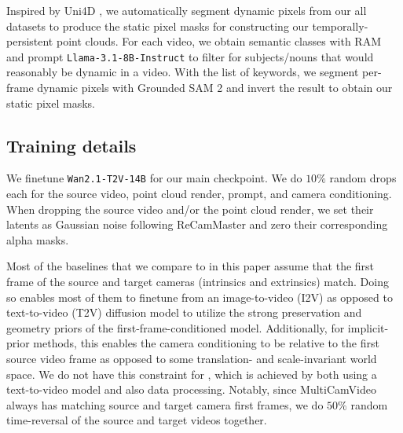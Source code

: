 Inspired by Uni4D \cite{yao2025uni4d}, we automatically segment dynamic pixels from our all datasets to produce the static pixel masks for constructing our temporally-persistent point clouds. For each video, we obtain semantic classes with RAM \cite{zhang2023ram} and prompt \texttt{Llama-3.1-8B-Instruct} \cite{llama2024llama3} to filter for subjects/nouns that would reasonably be dynamic in a video. With the list of keywords, we segment per-frame dynamic pixels with Grounded SAM 2 \cite{ravi2024sam2, ren2024groundingdino, ren2024groundedsam} and invert the result to obtain our static pixel masks.

\subsection{Training details}

We finetune \texttt{Wan2.1-T2V-14B} \cite{wan2025} for our main checkpoint. We do $10\%$ random drops each for the source video, point cloud render, prompt, and camera conditioning. When dropping the source video and/or the point cloud render, we set their latents as Gaussian noise following ReCamMaster \cite{bai2025recammaster} and zero their corresponding alpha masks.

Most of the baselines that we compare to in this paper assume that the first frame of the source and target cameras (intrinsics and extrinsics) match. Doing so enables most of them to finetune from an image-to-video (I2V) as opposed to text-to-video (T2V) diffusion model to utilize the strong preservation and geometry priors of the first-frame-conditioned model. Additionally, for implicit-prior methods, this enables the camera conditioning to be relative to the first source video frame as opposed to some translation- and scale-invariant world space. We do not have this constraint for \methodname, which is achieved by both using a text-to-video model and also data processing. Notably, since MultiCamVideo always has matching source and target camera first frames, we do $50\%$ random time-reversal of the source and target videos together.

